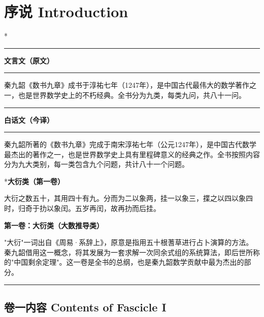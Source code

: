 \documentclass[11pt,a4paper]{article}
\newcommand{\zhtext}[1]{{\chinese #1}}
\newcommand{\leftcolheader}{%
  \noindent\textcolor{leftheader}{\rule{\columnwidth}{1.5pt}}\par
  \vspace{2pt}
  \noindent\textbf{\color{leftheader}\chinese 文言文（原文）}\par
  \vspace{2pt}
  \noindent\textcolor{leftheader}{\rule{\columnwidth}{0.6pt}}\par
  \vspace{4pt}
}
\newcommand{\rightcolheader}{%
  \noindent\textcolor{rightheader}{\rule{\columnwidth}{1.5pt}}\par
  \vspace{2pt}
  \noindent\textbf{\color{rightheader}\chinese 白话文（今译）}\par
  \vspace{2pt}
  \noindent\textcolor{rightheader}{\rule{\columnwidth}{0.6pt}}\par
  \vspace{4pt}
}
\begin{document}
\tableofcontents
\newpage

\section{\zhtext{序说} Introduction}

\switchcolumn[0]*\leftcolheader

秦九韶《数书九章》成书于淳祐七年（1247年），是中国古代最伟大的数学著作之一，也是世界数学史上的不朽经典。全书分为九类，每类九问，共八十一问。

\switchcolumn\rightcolheader

秦九韶所著的《数书九章》完成于南宋淳祐七年（公元1247年），是中国古代数学最杰出的著作之一，也是世界数学史上具有里程碑意义的经典之作。全书按照内容分为九大类别，每一类包含九个问题，共计八十一个问题。

\switchcolumn[0]*\textbf{\color{algocolor}\chinese 大衍类（第一卷）}

大衍之数五十，其用四十有九。分而为二以象两，挂一以象三，揲之以四以象四时，归奇于扐以象闰。五岁再闰，故再扐而后挂。

\switchcolumn\textbf{\color{algocolor}\chinese 第一卷：大衍类（大数推导类）}

"大衍"一词出自《周易·系辞上》，原意是指用五十根蓍草进行占卜演算的方法。秦九韶借用这一概念，将其发展为一套求解一次同余式组的系统算法，即后世所称的"中国剩余定理"。这一卷是全书的总纲，也是秦九韶数学贡献中最为杰出的部分。

\medskip

\noindent\textcolor{rulecolor}{\rule{\textwidth}{0.4pt}}

\subsection{\zhtext{卷一内容} Contents of Fascicle I}
\end{document}
